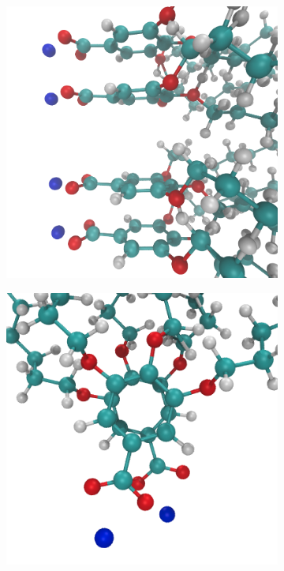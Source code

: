 \documentclass[journal=jpcbfk,manuscript=article]{achemso}
\begin{document}
  
  \begin{figure}[!htb]
  \centering
  \begin{subfigure}{0.3\linewidth}
  	\centering
  	\includegraphics[width=\textwidth]{staggered.png}
	\label{fig:staggered}
  \end{subfigure}
  \begin{subfigure}{0.3\linewidth}
  	\centering
  	\includegraphics[width=\textwidth]{rotated_monomers.png}

\end{subfigure}
\end{figure}
\end{document}
